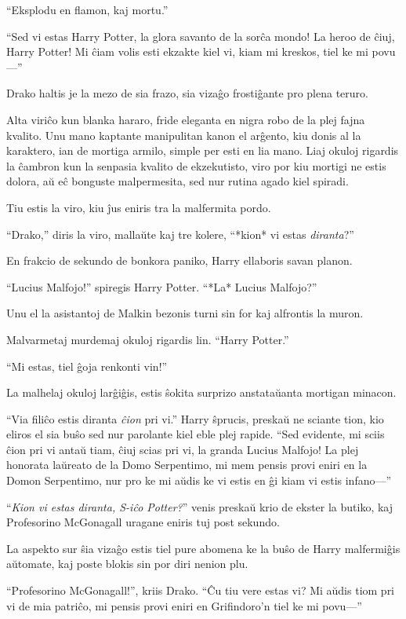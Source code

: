 ``Eksplodu en flamon, kaj mortu.''

``Sed vi estas Harry Potter, la glora savanto de la sorĉa mondo! La
heroo de ĉiuj, Harry Potter! Mi ĉiam volis esti ekzakte kiel vi, kiam
mi kreskos, tiel ke mi povu—''

Drako haltis je la mezo de sia frazo, sia vizaĝo frostiĝante pro plena
teruro.

Alta viriĉo kun blanka hararo, fride eleganta en nigra robo de la plej
fajna kvalito. Unu mano kaptante manipulitan kanon el arĝento, kiu
donis al la karaktero, ian de mortiga armilo, simple per esti en lia
mano. Liaj okuloj rigardis la ĉambron kun la senpasia kvalito de
ekzekutisto, viro por kiu mortigi ne estis dolora, aŭ eĉ bonguste
malpermesita, sed nur rutina agado kiel spiradi.

Tiu estis la viro, kiu ĵus eniris tra la malfermita pordo.


``Drako,'' diris la viro, mallaŭte kaj tre kolere, ``*kion* vi estas
\emph{diranta}?''

En frakcio de sekundo de bonkora paniko, Harry ellaboris savan planon.

``Lucius Malfojo!'' spiregis Harry Potter. ``*La* Lucius Malfojo?''

Unu el la asistantoj de Malkin bezonis turni sin for kaj alfrontis la muron.

Malvarmetaj murdemaj okuloj rigardis lin. ``Harry Potter.''

``Mi estas, tiel ĝoja renkonti vin!''

La malhelaj okuloj larĝiĝis, estis ŝokita surprizo anstataŭanta mortigan
minacon.

``Via filiĉo estis diranta \emph{ĉion} pri vi.'' Harry ŝprucis,
preskaŭ ne sciante tion, kio eliros el sia buŝo sed nur parolante kiel
eble plej rapide. ``Sed evidente, mi sciis ĉion pri vi antaŭ tiam,
ĉiuj scias pri vi, la granda Lucius Malfojo! La plej honorata laŭreato
de la Domo Serpentimo, mi mem pensis provi eniri en la Domon
Serpentimo, nur pro ke mi aŭdis ke vi estis en ĝi kiam vi estis
infano—''

``\emph{Kion vi estas diranta, S-iĉo Potter?}'' venis preskaŭ krio de
ekster la butiko, kaj Profesorino McGonagall uragane eniris tuj
post sekundo.

La aspekto sur ŝia vizaĝo estis tiel pure abomena ke la buŝo de Harry
malfermiĝis aŭtomate, kaj poste blokis sin por diri nenion plu.

``Profesorino McGonagall!'', kriis Drako. ``Ĉu tiu vere estas vi? Mi
aŭdis tiom pri vi de mia patriĉo, mi pensis provi eniri en Grifindoro'n
tiel ke mi povu—''

